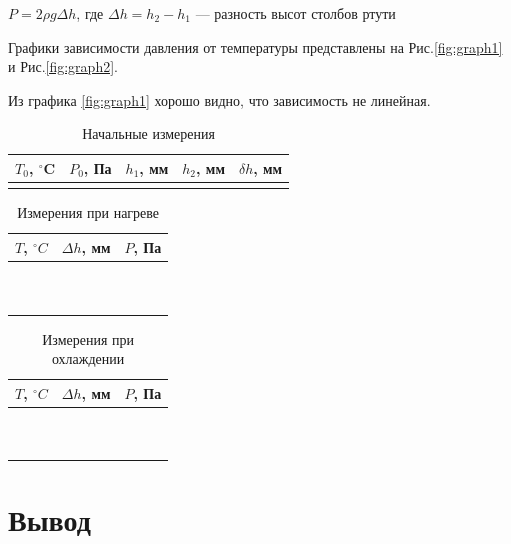 \documentclass[a4paper,12pt]{article} %
\begin{document}
$P = 2\rho g\Delta h$, где $\Delta h = h_2 - h_1$ — разность высот столбов ртути

\medskip

Графики зависимости давления от температуры представлены на Рис.\ref{fig:graph1} и Рис.\ref{fig:graph2}.

Из графика \ref{fig:graph1} хорошо видно, что зависимость не линейная. 

\begin{table}[h]
    \caption{Начальные измерения}
    \centering
        \begin{tabular}{|c|c|c|c|c|}
     \hline $T_{0}$, $^\circ$C & $P_{0}$, Па & $h_1$, мм & $h_2$, мм & $\delta h$, мм \\
    \hline  &  &  &  &  \\
    \hline
\end{tabular}
    \label{tab:init}
\end{table}
\begin{table}[h]
    \caption{Измерения при нагреве}
    \begin{tabular}{|c|c|c|}
        \hline $T$, $^\circ C$  &  $\Delta h$, мм & $P$, Па \\
        \hline  &  &  \\
        \hline  &  &  \\
        \hline  &  &  \\
        \hline  &  &  \\
        \hline  &  &  \\
        \hline  &  &  \\
        \hline  &  &  \\
        \hline  &  &  \\
        \hline  &  &  \\
        \hline  &  &  \\
        \hline
    \end{tabular}
    \label{tab:heating}
\end{table}
\begin{table}[h]
    \caption{Измерения при охлаждении}
    \begin{tabular}{|c|c|c|}
        \hline $T$, $^\circ C$  &  $\Delta h$, мм & $P$, Па \\
        \hline  &  &  \\
        \hline  &  &  \\
        \hline  &  &  \\
        \hline  &  &  \\
        \hline  &  &  \\
        \hline  &  &  \\
        \hline  &  &  \\
        \hline  &  &  \\
        \hline  &  &  \\
        \hline  &  &  \\
        \hline 
    \end{tabular}
    \label{tab:cooling}
\end{table}

\section{Вывод}
\end{document}
